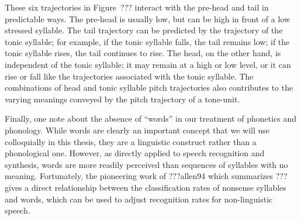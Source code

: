 These six trajectories in Figure~???
interact with the pre-head and tail
in predictable ways.
The pre-head is usually low,
but can be high in front of a low stressed syllable.
The tail trajectory can be predicted
by the trajectory of the tonic syllable;
for example, if the tonic syllable falls,
the tail remains low;
if the tonic syllable rises,
the tail continues to rise.
The head, on the other hand,
is independent of the tonic syllable;
it may remain at a high or low level,
or it can rise or fall like
the trajectories associated with the tonic syllable.
The combinations of head and tonic syllable
pitch trajectories also contributes
to the varying meanings conveyed
by the pitch trajectory of a tone-unit.

Finally, one note about
the absence of ``words'' in our treatment
of phonetics and phonology.
While words are clearly an important concept
that we will use colloquially in this thesis,
they are a linguistic construct
rather than a phonological one.
However, as directly applied
to speech recognition and synthesis,
words are more readily perceived
than sequences of syllables with no meaning.
Fortunately, the pioneering work
of ???allen94 which summarizes ???
gives a direct relationship between
the classification rates of nonsense syllables and words,
which can be used to adjust
recognition rates for
non-linguistic speech.

